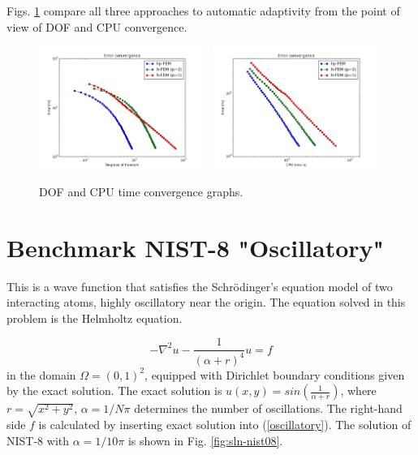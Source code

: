 \documentclass[12pt]{elsarticle}
\begin{document}

Figs. \ref{fig:nist-7-conv} compare all
three approaches to automatic adaptivity from the point
of view of DOF and CPU convergence.

\begin{figure}[!ht]
\centering
\includegraphics[height=4cm]{nist/nist-7/conv_dof_aniso.png}\ \
\includegraphics[height=4cm]{nist/nist-7/conv_cpu_aniso.png}
\caption{DOF and CPU time convergence graphs.}
\label{fig:nist-7-conv}
\end{figure}


\section{Benchmark NIST-8 "Oscillatory"}
\label{sec:bench-8}

This is a wave function that satisfies the Schr\"{o}dinger's equation model of two
interacting atoms, highly oscillatory near the origin.
The equation solved in this problem is the Helmholtz equation.

\begin{equation} \label{oscillatory}
-\nabla^{2} u - \frac{1}{(\alpha + r)^{4}} u = f
\end{equation}
in the domain $\Omega = (0, 1)^2$, equipped with Dirichlet boundary conditions
given by the exact solution. The exact solution is
$u(x,y) = sin(\frac{1}{\alpha + r})$,
where $r = \sqrt{x^{2} + y^{2}}$, $\alpha = 1 / N \pi$ determines the number of oscillations.
The right-hand side $f$ is calculated by inserting exact solution into (\ref{oscillatory}).
The solution of NIST-8 with $\alpha = 1 / 10 \pi$ is shown in Fig. \ref{fig:sln-nist08}.
\end{document}
